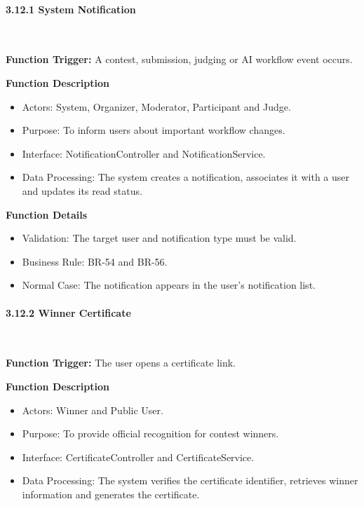 \paragraph*{3.12.1 System Notification}\leavevmode\\[-0.5em]
\label{par:system-notification}

\textbf{Function Trigger:} A contest, submission, judging or AI workflow event occurs.

\textbf{Function Description}
\begin{itemize}[leftmargin=1.5em, nosep]
    \item Actors: System, Organizer, Moderator, Participant and Judge.
    \item Purpose: To inform users about important workflow changes.
    \item Interface: NotificationController and NotificationService.
    \item Data Processing: The system creates a notification, associates it with a user and updates its read status.
\end{itemize}

\textbf{Function Details}
\begin{itemize}[leftmargin=1.5em, nosep]
    \item Validation: The target user and notification type must be valid.
    \item Business Rule: BR-54 and BR-56.
    \item Normal Case: The notification appears in the user's notification list.
\end{itemize}

\paragraph*{3.12.2 Winner Certificate}\leavevmode\\[-0.5em]
\label{par:winner-certificate}

\textbf{Function Trigger:} The user opens a certificate link.

\textbf{Function Description}
\begin{itemize}[leftmargin=1.5em, nosep]
    \item Actors: Winner and Public User.
    \item Purpose: To provide official recognition for contest winners.
    \item Interface: CertificateController and CertificateService.
    \item Data Processing: The system verifies the certificate identifier, retrieves winner information and generates the certificate.
\end{itemize}

